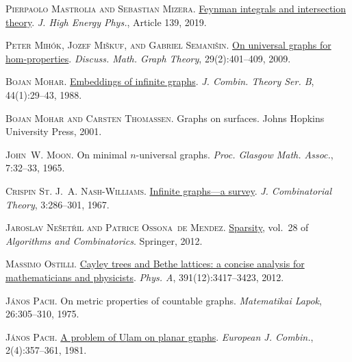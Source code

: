 \documentclass[a4paper,11pt]{article}
\theoremstyle{plain}
\theoremstyle{definition}
\begin{document}
\textsc{Pierpaolo Mastrolia and Sebastian Mizera}.
\newblock \href{https://doi.org/10.1007/jhep02(2019)139}{Feynman integrals and
  intersection theory}.
\newblock \emph{J. High Energy Phys.}, Article 139, 2019.

\textsc{Peter Mih\'{o}k, Jozef Mi\v{s}kuf, and Gabriel Semani\v{s}in}.
\newblock \href{https://doi.org/10.7151/dmgt.1455}{On universal graphs for
  hom-properties}.
\newblock \emph{Discuss. Math. Graph Theory}, 29(2):401--409, 2009.

\textsc{Bojan Mohar}.
\newblock \href{https://doi.org/10.1016/0095-8956(88)90094-9}{Embeddings of
  infinite graphs}.
\newblock \emph{J. Combin. Theory Ser. B}, 44(1):29--43, 1988.

\textsc{Bojan Mohar and Carsten Thomassen}.
\newblock Graphs on surfaces.
\newblock Johns Hopkins University Press, 2001.

\textsc{John~W. Moon}.
\newblock On minimal {$n$}-universal graphs.
\newblock \emph{Proc. Glasgow Math. Assoc.}, 7:32--33, 1965.

\textsc{Crispin St. J.~A. Nash-Williams}.
\newblock \href{https://doi.org/10.1016/S0021-9800(67)80077-2}{Infinite
  graphs---a survey}.
\newblock \emph{J. Combinatorial Theory}, 3:286--301, 1967.

\textsc{Jaroslav Ne{\v{s}}et{\v{r}}il and Patrice Ossona~de Mendez}.
\newblock \href{https://doi.org/10.1007/978-3-642-27875-4}{Sparsity}, vol.~28
  of \emph{Algorithms and Combinatorics}.
\newblock Springer, 2012.

\textsc{Massimo Ostilli}.
\newblock \href{https://doi.org/10.1016/j.physa.2012.01.038}{Cayley trees and
  {B}ethe lattices: a concise analysis for mathematicians and physicists}.
\newblock \emph{Phys. A}, 391(12):3417--3423, 2012.

\textsc{J\'{a}nos Pach}.
\newblock On metric properties of countable graphs.
\newblock \emph{Matematikai Lapok}, 26:305--310, 1975.

\textsc{J\'{a}nos Pach}.
\newblock \href{https://doi.org/10.1016/S0195-6698(81)80043-1}{A problem of
  {U}lam on planar graphs}.
\newblock \emph{European J. Combin.}, 2(4):357--361, 1981.
\end{document}
